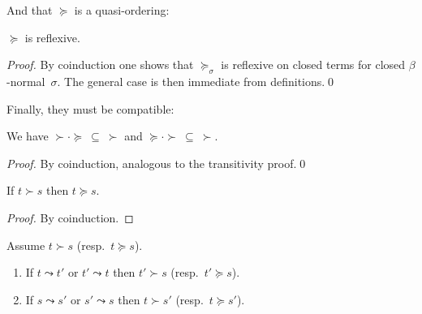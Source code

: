\documentclass[runningheads,a4paper]{llncs}
\begin{document}
And that $\succeq$ is a quasi-ordering:

\begin{lemma}
  $\succeq$ is reflexive.
\end{lemma}

\begin{proof}
  By coinduction one shows that $\succeq_\sigma$ is reflexive on
  closed terms for closed $\beta$-normal~$\sigma$. The general case is
  then immediate from definitions.\qed
\end{proof}

Finally, they must be compatible:

\begin{lemma}\label{lem:compatibility}
  We have $\succ \cdot \succeq\ \subseteq\ \succ$ and $\succeq \cdot
  \succ\ \subseteq\ \succ$.
\end{lemma}

\begin{proof}
  By coinduction, analogous to the transitivity proof.\qed
\end{proof}

\begin{lemma}\label{lem_succ_to_succeq}
  If $t \succ s$ then $t \succeq s$.
\end{lemma}

\begin{proof}
  By coinduction.
\end{proof}

\begin{lemma}\label{lem_succ_red}
  Assume $t \succ s$ (resp.~$t \succeq s$).
  \begin{enumerate}
  \item If $t \leadsto t'$ or $t' \leadsto t$ then $t' \succ s$ (resp.~$t' \succeq s$).
  \item If $s \leadsto s'$ or $s' \leadsto s$ then $t \succ s'$
    (resp.~$t \succeq s'$).
  \end{enumerate}
\end{lemma}
\end{document}
